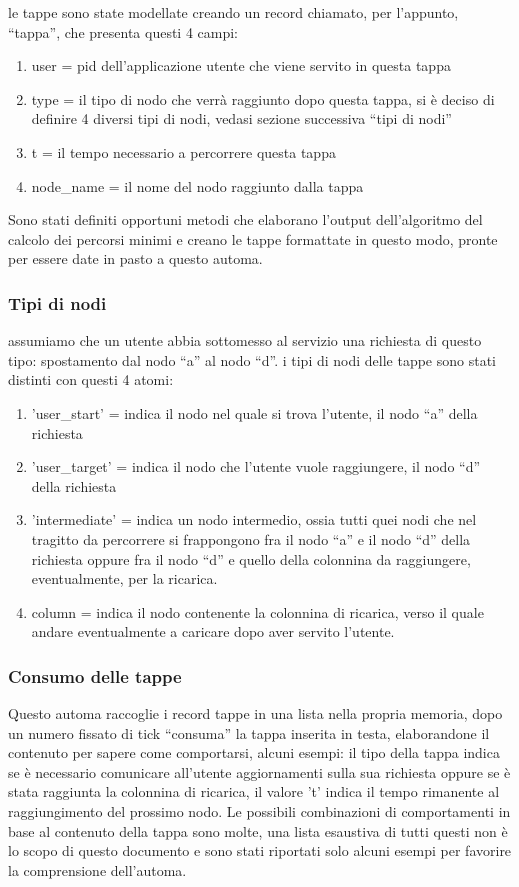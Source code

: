 le tappe sono state modellate creando un record chiamato, per l'appunto, ``tappa'', che presenta questi 4 campi:

\begin{enumerate}
	\item user = pid dell'applicazione utente che viene servito in questa tappa
	\item type = il tipo di nodo che verrà raggiunto dopo questa tappa, si è deciso di definire 4 diversi tipi di nodi, vedasi sezione successiva ``tipi di nodi''
	\item t = il tempo necessario a percorrere questa tappa
	\item node\_name = il nome del nodo raggiunto dalla tappa
\end{enumerate}
Sono stati definiti opportuni metodi che elaborano l'output dell'algoritmo del calcolo dei percorsi minimi e creano le tappe formattate in questo modo, pronte per essere date in pasto a questo automa.

\subsubsection{Tipi di nodi} \label{tipiTappe}

assumiamo che un utente abbia sottomesso al servizio una richiesta di questo tipo: spostamento dal nodo ``a'' al nodo ``d''.
i tipi di nodi delle tappe sono stati distinti con questi 4 atomi:

\begin{enumerate}
	\item 'user\_start' = indica il nodo nel quale si trova l'utente, il nodo ``a'' della richiesta
	\item 'user\_target' =  indica il nodo che l'utente vuole raggiungere, il nodo ``d'' della richiesta
	\item 'intermediate' =  indica un nodo intermedio, ossia tutti quei nodi che nel tragitto da percorrere si frappongono fra il nodo ``a'' e il nodo ``d'' della richiesta oppure fra il nodo ``d'' e quello della colonnina da raggiungere, eventualmente, per la ricarica.
	\item column = indica il nodo contenente la colonnina di ricarica, verso il quale andare eventualmente a caricare dopo aver servito l'utente.
\end{enumerate}

\subsubsection{Consumo delle tappe} \label{consumo tappe}
Questo automa raccoglie i record tappe in una lista nella propria memoria, dopo un numero fissato di tick ``consuma'' la  tappa inserita in testa, elaborandone il contenuto per sapere come comportarsi, alcuni esempi: il tipo della tappa indica se è necessario comunicare all'utente aggiornamenti sulla sua richiesta oppure se è stata raggiunta la colonnina di ricarica, il valore 't' indica il tempo rimanente al raggiungimento del prossimo nodo.
Le possibili combinazioni di comportamenti in base al contenuto della tappa sono molte, una lista esaustiva di tutti questi non è lo scopo di questo documento e sono stati riportati solo alcuni esempi per favorire la comprensione dell'automa.

